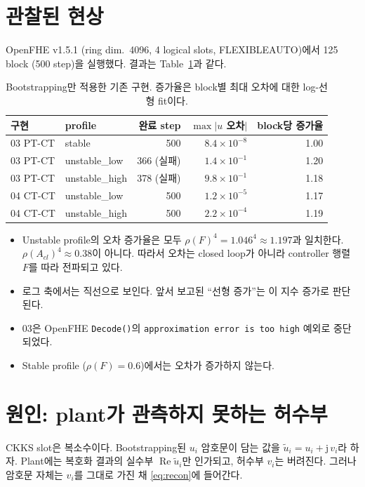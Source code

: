 \documentclass[11pt,a4paper]{article}
\renewcommand{\Re}{\operatorname{Re}}
\begin{document}
\section{관찰된 현상}

OpenFHE v1.5.1 (ring dim.\ 4096, 4 logical slots, FLEXIBLEAUTO)에서 125 block (500 step)을 실행했다.
결과는 Table~\ref{tab:baseline}과 같다.

\begin{table}[h]
\centering
\begin{tabular}{llrrr}
\toprule
구현 & profile & 완료 step & $\max|u$ 오차$|$ & block당 증가율 \\
\midrule
03 PT-CT & stable        & 500 & $8.4\times10^{-8}$ & 1.00 \\
03 PT-CT & unstable\_low  & 366 (실패) & $1.4\times10^{-1}$ & 1.20 \\
03 PT-CT & unstable\_high & 378 (실패) & $9.8\times10^{-1}$ & 1.18 \\
04 CT-CT & unstable\_low  & 500 & $1.2\times10^{-5}$ & 1.17 \\
04 CT-CT & unstable\_high & 500 & $2.2\times10^{-4}$ & 1.19 \\
\bottomrule
\end{tabular}
\caption{Bootstrapping만 적용한 기존 구현. 증가율은 block별 최대 오차에 대한 log-선형 fit이다.}
\label{tab:baseline}
\end{table}

\begin{itemize}
\item Unstable profile의 오차 증가율은 모두 $\rho(F)^4=1.046^4\approx1.197$과 일치한다.
      $\rho(A_{cl})^4\approx0.38$이 아니다.
      따라서 오차는 closed loop가 아니라 controller 행렬 $F$를 따라 전파되고 있다.
\item 로그 축에서는 직선으로 보인다. 앞서 보고된 ``선형 증가''는 이 지수 증가로 판단된다.
\item 03은 OpenFHE \texttt{Decode()}의 \texttt{approximation error is too high} 예외로 중단되었다.
\item Stable profile ($\rho(F)=0.6$)에서는 오차가 증가하지 않는다.
\end{itemize}

\section{원인: plant가 관측하지 못하는 허수부}

CKKS slot은 복소수이다.
Bootstrapping된 $u_i$ 암호문이 담는 값을 $\tilde u_i=u_i+\mathrm{j}\,v_i$라 하자.
Plant에는 복호화 결과의 실수부 $\Re\tilde u_i$만 인가되고, 허수부 $v_i$는 버려진다.
그러나 암호문 자체는 $v_i$를 그대로 가진 채 \eqref{eq:recon}에 들어간다.
\end{document}
